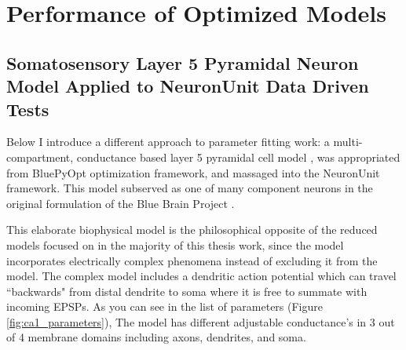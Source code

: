 



%


\section{Performance of Optimized Models}
\label{sec:optimization-performance}

\subsection{Somatosensory Layer 5 Pyramidal Neuron Model Applied to NeuronUnit Data Driven Tests}

Below I introduce a different approach to parameter fitting work: a multi-compartment, conductance based layer 5 pyramidal cell model \citep{van2016bluepyopt}, was appropriated from BluePyOpt optimization framework, and massaged into the NeuronUnit framework.
This model subserved as one of many component neurons in the original formulation of the Blue Brain Project \cite{markram2015reconstruction}.


This elaborate biophysical model is the philosophical opposite of the reduced models focused on in the majority of this thesis work, since the model incorporates electrically complex phenomena instead of excluding it from the model.
The complex model includes a dendritic action potential which can travel ``backwards" from distal dendrite to soma where it is free to summate with incoming EPSPs.
As you can see in the list of parameters (Figure \ref{fig:ca1_parameters}), The model has different adjustable conductance's in 3 out of 4 membrane domains including axons, dendrites, and soma. 


